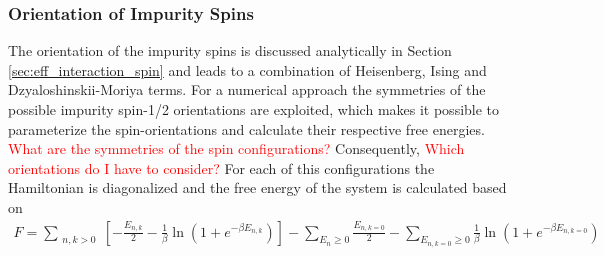 \subsubsection{Orientation of Impurity Spins}
The orientation of the impurity spins is discussed analytically in Section \ref{sec:eff_interaction_spin} and leads to a combination of Heisenberg, Ising and Dzyaloshinskii-Moriya terms.\newline %
For a numerical approach the symmetries of the possible impurity spin-1/2 orientations are exploited, which makes it possible to parameterize the spin-orientations and calculate their respective free energies. \newline
\textcolor{red}{What are the symmetries of the spin configurations? } \newline
Consequently, \textcolor{red}{Which orientations do I have to consider?} \newline
For each of this configurations the Hamiltonian is diagonalized and the free energy of the system is calculated based on
\begin{align}\label{eq:free_energy_num}
    F = \sum_{\substack{n,k>0}}\left[ -\frac{E_{n,k}}{2} - \frac{1}{\beta}\ln{(1+ e^{-\beta E_{n,k}})} \right] -\sum_{E_{n} \geq 0} \frac{E_{n,k=0}}{2} - \sum_{E_{n,k=0} \geq 0} \frac{1}{\beta}\ln{(1+ e^{-\beta E_{n,k=0}})}
\end{align}
